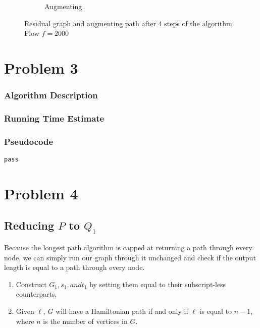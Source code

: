 \documentclass{math}
\begin{document}
\begin{figure}
\begin{subfigure}[h]{0.49\textwidth}
        \caption{Augmenting}
    \end{subfigure}
    \caption{Residual graph and augmenting path after 4 steps of the algorithm.
    Flow $f = 2000$}
    \label{fig:step4}
\end{figure}


\section*{Problem 3}


\subsubsection*{Algorithm Description}


\subsubsection*{Running Time Estimate}


\subsubsection*{Pseudocode}

\begin{lstlisting}
pass
\end{lstlisting}


\section*{Problem 4}


\subsection*{Reducing \( P \) to \( Q_1 \)}

Because the longest path algorithm is capped at returning a path through every
node, we can simply run our graph through it unchanged and check if the output
length is equal to a path through every node.
\begin{enumerate}
\renewcommand{\theenumi}{\alph{enumi}}
    \item Construct \( G_1, s_1, and t_1 \) by setting them equal to their
        subscript-less counterparts.
    \item Given \( \ell \), \( G \) will have a Hamiltonian path if and only
        if \( \ell \) is equal to \( n - 1 \), where \( n \) is the number of
        vertices in \( G \).
\end{enumerate}
\end{document}
